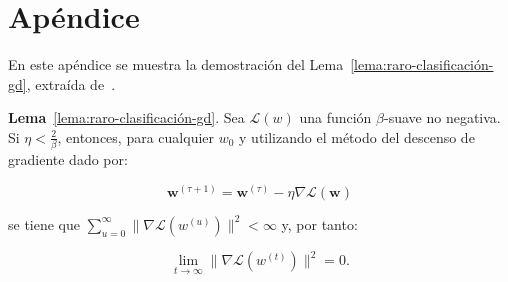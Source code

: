 
\chapter{Apéndice}\label{ap:apendiceA}

En este apéndice se muestra la demostración del Lema~\ref{lema:raro-clasificación-gd}, extraída de~\cite{Soudry2024}.\newline

\textbf{Lema}~\ref{lema:raro-clasificación-gd}. Sea $\mathcal{L}(w)$ una función $\beta$-suave no negativa. Si $\eta < \frac{2}{\beta}$, entonces, para cualquier $w_0$ y utilizando el método del descenso de gradiente dado por:

\[
    \mathbf{w}^{(\tau + 1)} = \mathbf{w}^{(\tau)} - \eta \nabla \mathcal{L}(\mathbf{w})
\]

se tiene que $\sum_{u=0}^{\infty} \| \nabla\mathcal{L}(w^{(u)}) \|^{2} < \infty$ y, por tanto:

\[
    \lim \limits_{t \to \infty} \| \nabla\mathcal{L}(w^{(t)}) \|^{2} = 0.
\]

